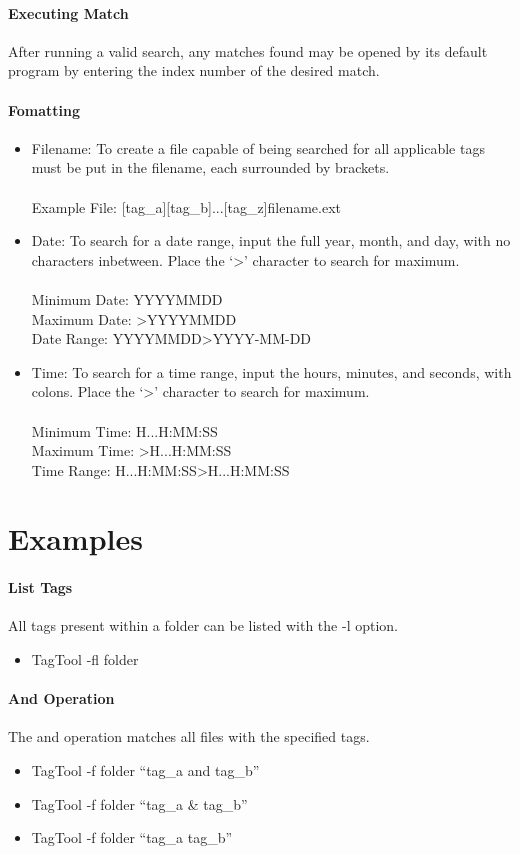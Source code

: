 \documentclass[12pt]{article}
\begin{document}
\paragraph{Executing Match} After running a valid search, any matches found may be opened by its default program by entering the index number of the desired match.
\paragraph{Fomatting}
\begin{itemize}
    \item Filename: To create a file capable of being searched for all applicable tags must be put in the filename, each surrounded by brackets.\\\\
    Example File: [tag\_a][tag\_b]...[tag\_z]filename.ext
    \item Date: To search for a date range, input the full year, month, and day, with no characters inbetween. Place the `>' character to search for maximum.\\\\
    Minimum Date: YYYYMMDD\\
    Maximum Date: >YYYYMMDD\\
    Date Range: YYYYMMDD>YYYY-MM-DD
    \item Time: To search for a time range, input the hours, minutes, and seconds, with colons. Place the `>' character to search for maximum.\\\\
    Minimum Time: H...H:MM:SS\\
    Maximum Time: >H...H:MM:SS\\
    Time Range: H...H:MM:SS>H...H:MM:SS
\end{itemize}
\section{Examples}\label{examples}
\paragraph{List Tags} All tags present within a folder can be listed with the -l option.
\begin{itemize}
    \item TagTool -fl folder
\end{itemize}
\paragraph{And Operation} The and operation matches all files with the specified tags.
\begin{itemize}
    \item TagTool -f folder ``tag\_a and tag\_b''
    \item TagTool -f folder ``tag\_a \& tag\_b''
    \item TagTool -f folder ``tag\_a tag\_b''
\end{itemize}
\end{document}
